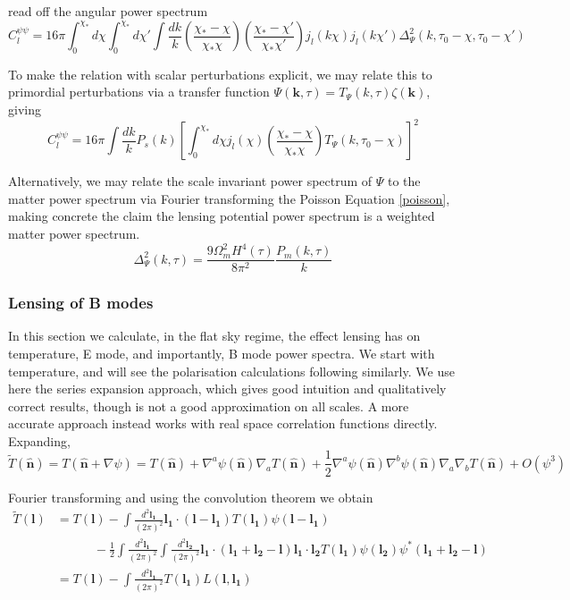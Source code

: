 \documentclass[a4paper,10pt]{article}
\renewcommand{\v}[1]{\mathbf{#1}}
\newcommand{\half}{\frac{1}{2}}
\newcommand{\finttwo}[1]{\int \frac{d^2 \v{#1}}{(2\pi)^2}}
\newcommand{\unit}[1]{\hat{\v{#1}}}
\begin{document}
read off the angular power spectrum
\begin{equation}
C_l^{\psi\psi} = 16\pi \int_0^{\chi_*} d\chi \int_0^{\chi_*} d\chi' \int \frac{dk}{k} (\frac{\chi_*-\chi}{\chi_*\chi})(\frac{\chi_*-\chi'}{\chi_*\chi'})j_l(k\chi)j_l(k\chi')\Delta^2_\Psi(k, \tau_0-\chi, \tau_0-\chi')
\end{equation}

To make the relation with scalar perturbations explicit, we may relate this to primordial perturbations via a transfer function $\Psi(\v{k},\tau)=T_\Psi(k,\tau)\zeta(\v{k})$, giving
\begin{equation}
C_l^{\psi\psi} = 16\pi \int \frac{dk}{k} P_s(k) \left[\int_0^{\chi_*} d\chi j_l(\chi) (\frac{\chi_*-\chi}{\chi_*\chi})T_\Psi(k, \tau_0-\chi)\right]^2
\end{equation}

Alternatively, we may relate the scale invariant power spectrum of $\Psi$ to the matter power spectrum via Fourier transforming the Poisson Equation \ref{poisson}, making concrete the claim the lensing potential power spectrum is a weighted matter power spectrum.
\begin{equation}
\Delta^2_\Psi(k,\tau) = \frac{9\Omega^2_mH^4(\tau)}{8\pi^2}\frac{P_m(k,\tau)}{k}
\end{equation}

\subsubsection{Lensing of B modes} 

In this section we calculate, in the flat sky regime, the effect lensing has on temperature, E mode, and importantly, B mode power spectra. We start with temperature, and will see the polarisation calculations following similarly. We use here the series expansion approach, which gives good intuition and qualitatively correct results, though is not a good approximation on all scales. A more accurate approach instead works with real space correlation functions directly. Expanding,
\begin{equation}
\tilde{T}(\unit{n}) = T(\unit{n}+\nabla\psi) =T(\unit{n})+\nabla^a\psi(\unit{n})\nabla_aT(\unit{n})+\half\nabla^a\psi(\unit{n})\nabla^b\psi(\unit{n})\nabla_a\nabla_bT(\unit{n})+O(\psi^3)
\end{equation}

Fourier transforming and using the convolution theorem we obtain
\begin{equation}\begin{split}
\tilde{T}(\v{l}) &= T(\v{l}) - \finttwo{l_1} \v{l_1}\cdot(\v{l}-\v{l_1})T(\v{l_1})\psi(\v{l}-\v{l_1}) \\
& \qquad \quad -\half \finttwo{l_1}\finttwo{l_2}\v{l_1}\cdot(\v{l_1}+\v{l_2}-\v{l})\v{l_1}\cdot\v{l_2}T(\v{l_1})\psi(\v{l_2})\psi^*(\v{l_1}+\v{l_2}-\v{l})\\
&= T(\v{l}) - \finttwo{l_1} T(\v{l_1})L(\v{l},\v{l_1})
\label{lensedtemp}
\end{split}\end{equation}
\end{document}
